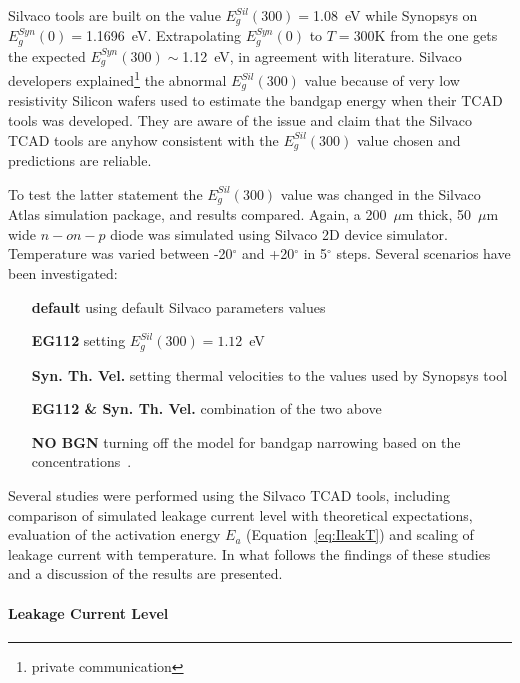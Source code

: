 \noindent Silvaco tools are built on the value $E^{Sil}_g(300)=$1.08~eV while Synopsys on $E^{Syn}_g(0)=$1.1696~eV. 
Extrapolating $E_g^{Syn}(0)$ to $T=$300K from the one gets the expected 
$E_g^{Syn}(300)\sim$1.12~eV, in agreement with literature.
\noindent Silvaco developers explained\footnote{private communication} the abnormal $E^{Sil}_g(300)$ value 
because of very low resistivity 
Silicon wafers used to estimate the bandgap energy when their TCAD tools was developed. 
They are aware of the issue and claim that the Silvaco TCAD tools are anyhow consistent with 
the $E^{Sil}_g(300)$ value chosen and predictions are reliable.  

To test the latter statement the $E^{Sil}_g(300)$ value was changed in the Silvaco Atlas simulation package, 
and results compared. 
Again, a 200~$\mu$m thick, 50~$\mu$m wide $n-on-p$ diode was simulated using Silvaco 2D device 
simulator. Temperature was varied between -20$^{\circ}$ and +20$^{\circ}$ in 5$^{\circ}$ steps. 
Several scenarios have been investigated:

\begin{center}
\begin{varwidth}{\textwidth}
\begin{itemize}
\item[\bf default] using default Silvaco parameters values
\item[\bf EG112] setting $E^{Sil}_g(300)=1.12$~eV
\item[\bf Syn. Th. Vel.] setting thermal velocities to the values used by Synopsys tool
\item[\bf EG112 \& Syn. Th. Vel.] combination of the two above 
\item[\bf NO BGN] turning off the model for bandgap narrowing based on the concentrations~\cite{SLOTBOOM1977279}.
\end{itemize}
\end{varwidth}
\end{center}

Several studies were performed using the Silvaco TCAD tools,
 including comparison of simulated leakage current level with 
theoretical expectations,  evaluation of the activation energy $E_{a}$ (Equation~\ref{eq:IleakT}) 
and scaling of leakage current with temperature. In what follows the findings of these 
studies and a discussion of the results are presented.

\paragraph{Leakage Current Level}




